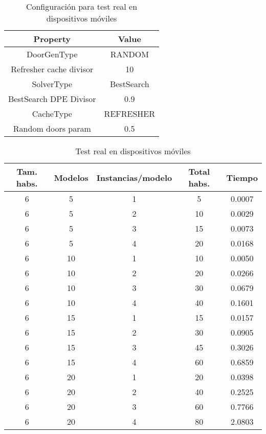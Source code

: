 \begin{table}[H]
\begin{center}
	\begin{tabular}{ | c | c | }
\hline
 		Property & Value \\ \hline
DoorGenType & RANDOM \\ 
Refresher cache divisor & 10 \\ 
SolverType & BestSearch \\ 
BestSearch DPE Divisor & 0.9 \\ 
CacheType & REFRESHER \\ 
Random doors param & 0.5 \\ 
\hline
	\end{tabular}
\end{center}
\caption{Configuración para test real en dispositivos móviles}
\label{table:cfg-optreal}
\end{table}


\begin{table}[H]
\begin{center}
	\begin{tabular}{ | c | c | c | c | c | }
\hline
Tam. habs. & Modelos & Instancias/modelo & Total habs. & Tiempo \\ \hline 
6 & 5 & 1 & 5 & 0.0007 \\ 
6 & 5 & 2 & 10 & 0.0029 \\ 
6 & 5 & 3 & 15 & 0.0073 \\ 
6 & 5 & 4 & 20 & 0.0168 \\ 
6 & 10 & 1 & 10 & 0.0050 \\ 
6 & 10 & 2 & 20 & 0.0266 \\ 
6 & 10 & 3 & 30 & 0.0679 \\ 
6 & 10 & 4 & 40 & 0.1601 \\ 
6 & 15 & 1 & 15 & 0.0157 \\ 
6 & 15 & 2 & 30 & 0.0905 \\ 
6 & 15 & 3 & 45 & 0.3026 \\ 
6 & 15 & 4 & 60 & 0.6859 \\ 
6 & 20 & 1 & 20 & 0.0398 \\ 
6 & 20 & 2 & 40 & 0.2525 \\ 
6 & 20 & 3 & 60 & 0.7766 \\ 
6 & 20 & 4 & 80 & 2.0803 \\ 
\hline
	\end{tabular}
\end{center}
\caption{Test real en dispositivos móviles}
\label{table:optreal}
\end{table}





